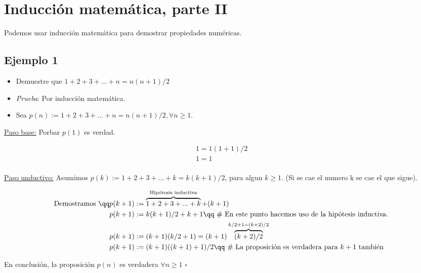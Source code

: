 \section{Inducción matemática, parte II}
Podemos usar inducción matemática para demostrar propiedades numéricas.

\subsection{Ejemplo 1}
\begin{itemize}
    \item Demuestre que $1+2+3+...+n = n(n+1)/2$ 
    \item \emph{Prueba}: Por inducción matemática. 
    \item Sea $p(n):=1+2+3+...+n=n(n+1)/2, \forall n \geq 1$. 
\end{itemize}

\underline{Paso base:} Porbar $p(1)$ es verdad.
\begin{center}
   \begin{align*}
       1 = 1(1+1)/2 \\ 
       1 = 1 \\ 
   \end{align*}
\end{center}

\underline{Paso unductivo:} Asumimos $p(k) := 1+2+3+...+k=k(k+1)/2$, para algun $k \geq 1$. (Si se cae el numero k se cae el que sigue).
\begin{center}
   \begin{align*}
       \text{ Demostramos } \qq &p(k+1):= \overbrace{1+2+3+...+k}^{\text{ Hipótesis inductiva }}+(k+1) \\ 
        & p(k+1) :=k(k+1)/2 + k+1 \qq \text{ \# En este punto hacemos uso de la hipótesis inductiva. } \\ 
        & p(k+1):= (k+1)(k/2+1) = (k+1)\overbrace{(k+2)/2}^{k/2+1=(k+2)/2} \\ 
        & p(k+1) := (k+1)((k+1)+1)/2 \qq \text{ \# La proposición es verdadera para $k+1$ también }\\ 
   \end{align*}
\end{center}

En conclusión, la proposición $p(n)$ es verdadera $\forall n \geq 1$  $\square $

